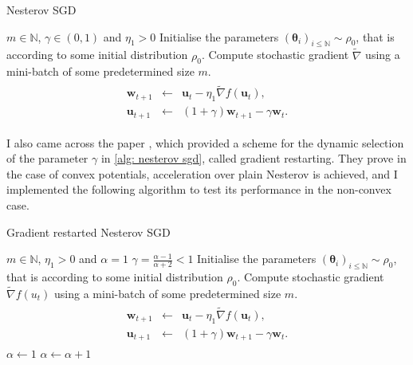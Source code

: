 \documentclass{article}
\theoremstyle{mystyle}
\newcommand{\N}{\ensuremath{\mathbb{N}}}
\begin{document}
\begin{examplesblock}{Nesterov SGD}\label{alg: nesterov sgd}
\begin{algorithmic}
\Require $ m\in \N $, $ \gamma\in (0,1)$ and $ \eta_{1}>0$
\State Initialise the parameters $(\mathbf{\theta}_{i})_{i\leq \N} \sim \rho_{0}$, that is according to some initial distribution $ \rho_{0}$.
\State Compute stochastic gradient $\tilde{\nabla} $ using a mini-batch of some predetermined size $ m$.
\State  \begin{eqnarray}\left.\begin{array}{lll}
\mathbf{w}_{t+1} &\leftarrow& \mathbf{u}_t - \eta_1 \tilde{\nabla}f(\mathbf{u}_t), \\
\mathbf{u}_{t+1} &\leftarrow& (1+\gamma)\mathbf{w}_{t+1} - \gamma \mathbf{w}_{t}.\end{array}\right.\label{eq:nesterovupdaterule}
\end{eqnarray}
\EndWhile

\end{algorithmic}

\end{examplesblock}

I also came across the paper \cite{ odonoghue2012adaptiverestartacceleratedgradient}, which provided a scheme for the dynamic selection of the parameter $ \gamma$ in \ref{alg: nesterov sgd}, called gradient restarting. They prove in the case of convex potentials, acceleration over plain Nesterov is achieved, and I implemented the following algorithm to test its performance in the non-convex case. 

\begin{examplesblock}{Gradient restarted Nesterov SGD}\label{alg: gradient restarted nesterov}
\begin{algorithmic}
\Require $ m\in \N $, $ \eta_{1}>0$ and $ \alpha = 1$
\State $ \gamma = \frac{\alpha-1}{\alpha+2}<1$
\State Initialise the parameters $(\mathbf{\theta}_{i})_{i\leq \N} \sim \rho_{0}$, that is according to some initial distribution $ \rho_{0}$.
\State Compute stochastic gradient $\tilde{\nabla}f(u_{t}) $ using a mini-batch of some predetermined size $ m$.
\State  \begin{eqnarray}\left.\begin{array}{lll}
\mathbf{w}_{t+1} &\leftarrow& \mathbf{u}_t - \eta_1 \tilde{\nabla}f(\mathbf{u}_t), \\
\mathbf{u}_{t+1} &\leftarrow& (1+\gamma)\mathbf{w}_{t+1} - \gamma \mathbf{w}_{t}.\end{array}\right.
\end{eqnarray}
 
\State $ \alpha \leftarrow 1$
\EndIf 
\State $\alpha \leftarrow \alpha +1$
\EndWhile

\end{algorithmic}

\end{examplesblock}
\end{document}
